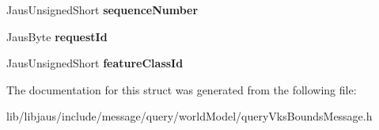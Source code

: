 \begin{DoxyCompactItemize}
\item 
\hypertarget{struct_query_vks_bounds_message_struct_a648c49c0ccb15c6bf6b984b3989153c5}{\-Jaus\-Unsigned\-Short {\bfseries sequence\-Number}}\label{struct_query_vks_bounds_message_struct_a648c49c0ccb15c6bf6b984b3989153c5}

\item 
\hypertarget{struct_query_vks_bounds_message_struct_a4d33dc284f4b05f7817694e0b2506565}{\-Jaus\-Byte {\bfseries request\-Id}}\label{struct_query_vks_bounds_message_struct_a4d33dc284f4b05f7817694e0b2506565}

\item 
\hypertarget{struct_query_vks_bounds_message_struct_a93f9bc5143016bbc93141997b02f933b}{\-Jaus\-Unsigned\-Short {\bfseries feature\-Class\-Id}}\label{struct_query_vks_bounds_message_struct_a93f9bc5143016bbc93141997b02f933b}

\end{DoxyCompactItemize}


\-The documentation for this struct was generated from the following file\-:\begin{DoxyCompactItemize}
\item 
lib/libjaus/include/message/query/world\-Model/query\-Vks\-Bounds\-Message.\-h\end{DoxyCompactItemize}
